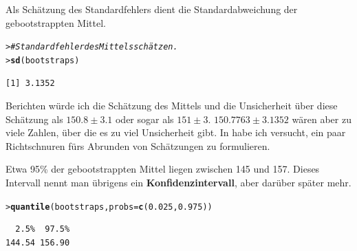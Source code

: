 \documentclass[oneside, 10pt]{book}\usepackage[]{graphicx}\usepackage[]{xcolor}
\makeatletter
\newcommand{\hlnum}[1]{\textcolor[rgb]{0.686,0.059,0.569}{#1}}%
\newcommand{\hlcom}[1]{\textcolor[rgb]{0.678,0.584,0.686}{\textit{#1}}}%
\newcommand{\hlstd}[1]{\textcolor[rgb]{0.345,0.345,0.345}{#1}}%
\newcommand{\hlkwc}[1]{\textcolor[rgb]{0.333,0.667,0.333}{#1}}%
\newcommand{\hlkwd}[1]{\textcolor[rgb]{0.737,0.353,0.396}{\textbf{#1}}}%
\newenvironment{kframe}{%
 \def\at@end@of@kframe{}%
 \ifinner\ifhmode%
  \def\at@end@of@kframe{\end{minipage}}%
  \begin{minipage}{\columnwidth}%
 \fi\fi%
 \def\FrameCommand##1{\hskip\@totalleftmargin \hskip-\fboxsep
 \colorbox{shadecolor}{##1}\hskip-\fboxsep
     \hskip-\linewidth \hskip-\@totalleftmargin \hskip\columnwidth}%
 \MakeFramed {\advance\hsize-\width
   \@totalleftmargin\z@ \linewidth\hsize
   \@setminipage}}%
 {\par\unskip\endMakeFramed%
 \at@end@of@kframe}
\newenvironment{knitrout}{}{} %
\makeatother
\begin{document}
Als Schätzung des Standardfehlers dient
die Standardabweichung der gebootstrappten Mittel.
\begin{knitrout}
\color{fgcolor}\begin{kframe}
\begin{alltt}
\hlstd{> }\hlcom{# Standardfehler des Mittels schätzen.}
\hlstd{> }\hlkwd{sd}\hlstd{(bootstraps)}
\end{alltt}
\begin{verbatim}
[1] 3.1352
\end{verbatim}
\end{kframe}
\end{knitrout}

Berichten würde ich die Schätzung des Mittels und die Unsicherheit über diese Schätzung als $150.8 \pm 3.1$ oder sogar als $151 \pm 3$.
$150.7763 \pm 3.1352$ wären aber zu viele Zahlen, über
die es zu viel Unsicherheit gibt. In \citet{Vanhove2020b} habe ich versucht, ein paar
Richtschnuren fürs Abrunden von Schätzungen zu formulieren.

Etwa 95\% der gebootstrappten Mittel liegen
zwischen 145 und 157. Dieses Intervall nennt
man übrigens ein \textbf{Konfidenzintervall},
aber darüber später mehr.
\begin{knitrout}
\color{fgcolor}\begin{kframe}
\begin{alltt}
\hlstd{> }\hlkwd{quantile}\hlstd{(bootstraps,} \hlkwc{probs} \hlstd{=} \hlkwd{c}\hlstd{(}\hlnum{0.025}\hlstd{,} \hlnum{0.975}\hlstd{))}
\end{alltt}
\begin{verbatim}
  2.5%  97.5% 
144.54 156.90 
\end{verbatim}
\end{kframe}
\end{knitrout}
\end{document}
